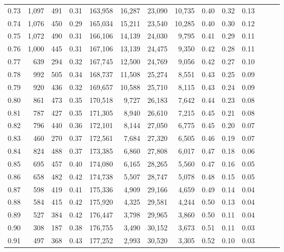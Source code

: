 \begin{tabular}{rrrrrrrrrrrrrr}
0.73 &  1,097 &    491 &  0.31 &  163,958 &   16,287 &  23,090 &  10,735 &  0.40 &  0.32 &      0.13 \\
0.74 &  1,076 &    450 &  0.29 &  165,034 &   15,211 &  23,540 &  10,285 &  0.40 &  0.30 &      0.12 \\
0.75 &  1,072 &    490 &  0.31 &  166,106 &   14,139 &  24,030 &   9,795 &  0.41 &  0.29 &      0.11 \\
0.76 &  1,000 &    445 &  0.31 &  167,106 &   13,139 &  24,475 &   9,350 &  0.42 &  0.28 &      0.11 \\
0.77 &    639 &    294 &  0.32 &  167,745 &   12,500 &  24,769 &   9,056 &  0.42 &  0.27 &      0.10 \\
0.78 &    992 &    505 &  0.34 &  168,737 &   11,508 &  25,274 &   8,551 &  0.43 &  0.25 &      0.09 \\
0.79 &    920 &    436 &  0.32 &  169,657 &   10,588 &  25,710 &   8,115 &  0.43 &  0.24 &      0.09 \\
0.80 &    861 &    473 &  0.35 &  170,518 &    9,727 &  26,183 &   7,642 &  0.44 &  0.23 &      0.08 \\
0.81 &    787 &    427 &  0.35 &  171,305 &    8,940 &  26,610 &   7,215 &  0.45 &  0.21 &      0.08 \\
0.82 &    796 &    440 &  0.36 &  172,101 &    8,144 &  27,050 &   6,775 &  0.45 &  0.20 &      0.07 \\
0.83 &    460 &    270 &  0.37 &  172,561 &    7,684 &  27,320 &   6,505 &  0.46 &  0.19 &      0.07 \\
0.84 &    824 &    488 &  0.37 &  173,385 &    6,860 &  27,808 &   6,017 &  0.47 &  0.18 &      0.06 \\
0.85 &    695 &    457 &  0.40 &  174,080 &    6,165 &  28,265 &   5,560 &  0.47 &  0.16 &      0.05 \\
0.86 &    658 &    482 &  0.42 &  174,738 &    5,507 &  28,747 &   5,078 &  0.48 &  0.15 &      0.05 \\
0.87 &    598 &    419 &  0.41 &  175,336 &    4,909 &  29,166 &   4,659 &  0.49 &  0.14 &      0.04 \\
0.88 &    584 &    415 &  0.42 &  175,920 &    4,325 &  29,581 &   4,244 &  0.50 &  0.13 &      0.04 \\
0.89 &    527 &    384 &  0.42 &  176,447 &    3,798 &  29,965 &   3,860 &  0.50 &  0.11 &      0.04 \\
0.90 &    308 &    187 &  0.38 &  176,755 &    3,490 &  30,152 &   3,673 &  0.51 &  0.11 &      0.03 \\
0.91 &    497 &    368 &  0.43 &  177,252 &    2,993 &  30,520 &   3,305 &  0.52 &  0.10 &      0.03 \\

\end{tabular}
